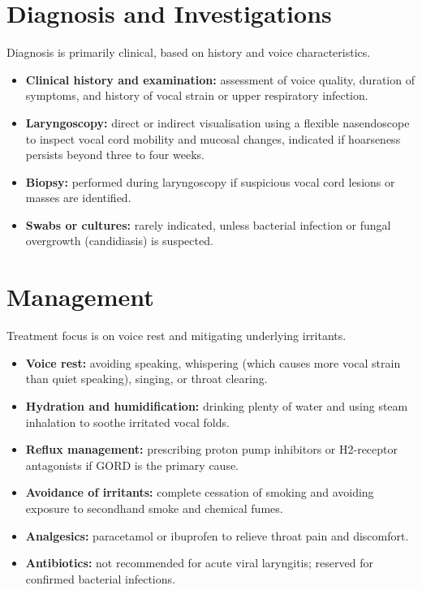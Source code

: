 \section*{Diagnosis and Investigations}
Diagnosis is primarily clinical, based on history and voice characteristics.
\begin{itemize}
    \item \textbf{Clinical history and examination:} assessment of voice quality, duration of symptoms, and history of vocal strain or upper respiratory infection.
    \item \textbf{Laryngoscopy:} direct or indirect visualisation using a flexible nasendoscope to inspect vocal cord mobility and mucosal changes, indicated if hoarseness persists beyond three to four weeks.
    \item \textbf{Biopsy:} performed during laryngoscopy if suspicious vocal cord lesions or masses are identified.
    \item \textbf{Swabs or cultures:} rarely indicated, unless bacterial infection or fungal overgrowth (candidiasis) is suspected.
\end{itemize}

\section*{Management}
Treatment focus is on voice rest and mitigating underlying irritants.
\begin{itemize}
    \item \textbf{Voice rest:} avoiding speaking, whispering (which causes more vocal strain than quiet speaking), singing, or throat clearing.
    \item \textbf{Hydration and humidification:} drinking plenty of water and using steam inhalation to soothe irritated vocal folds.
    \item \textbf{Reflux management:} prescribing proton pump inhibitors or H2-receptor antagonists if GORD is the primary cause.
    \item \textbf{Avoidance of irritants:} complete cessation of smoking and avoiding exposure to secondhand smoke and chemical fumes.
    \item \textbf{Analgesics:} paracetamol or ibuprofen to relieve throat pain and discomfort.
    \item \textbf{Antibiotics:} not recommended for acute viral laryngitis; reserved for confirmed bacterial infections.
\end{itemize}


